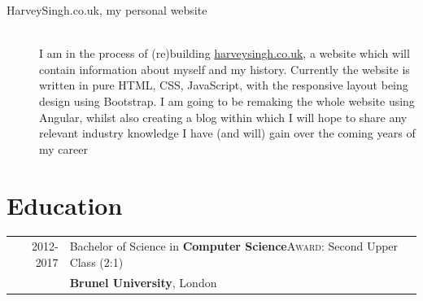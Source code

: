 \documentclass[a4paper,10pt]{extarticle} %
\begin{document}
{\begin{description}

\item[HarveySingh.co.uk, my personal website]\hfill \\
I am in the process of (re)building \href{harveysingh.co.uk}{harveysingh.co.uk}, a website which will contain information about myself and my history. Currently the website is written in pure HTML, CSS, JavaScript, with the responsive layout being design using Bootstrap. I am going to be remaking the whole website using Angular, whilst also creating a blog within which I will hope to share any relevant industry knowledge I have (and will) gain over the coming years of my career

\end{description}


\section{\textcolor{primary}{Education}}
\begin{tabular}{r|p{17.5cm}}	
2012-2017 & Bachelor of Science in \textbf{Computer Science}\hfill\textsc{Award}: Second Upper Class (2:1)\\
&\textbf{Brunel University}, London\\
\end{tabular}
\\


}
\end{document}
